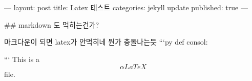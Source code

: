 ---
layout: post
title:  Latex 테스트
categories: jekyll update
published: true
---

## markdown 도 먹히는건가?

마크다운이 되면 latex가 안먹히네 뭔가 충돌나는듯
```py
def consol:

```
This is a $$\alpha{LaTeX}$$ file.
